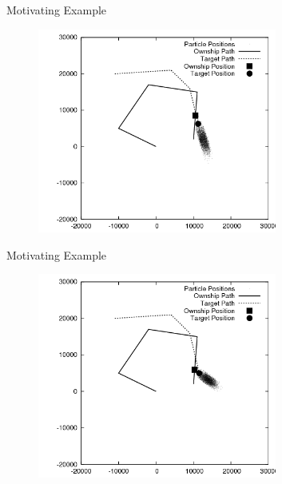 \documentclass{beamer}
\begin{document}
\begin{frame}{Motivating Example}
\begin{figure}
\centering
\includegraphics[width=0.7\textwidth]{data/azimuth_only_3500.png}
\end{figure}
\end{frame}


\begin{frame}{Motivating Example}
\begin{figure}
\centering
\includegraphics[width=0.7\textwidth]{data/azimuth_only_3700.png}
\end{figure}
\end{frame}

\end{document}
